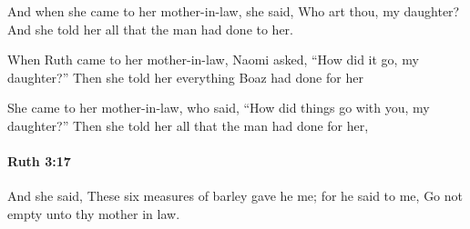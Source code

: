 			\begin{versebox}
					\item[BHS] 
					\item[LXX] 
					\item[ASV] And when she came to her mother-in-law, she said, Who art thou, my daughter? And she told her all that the man had done to her.
					\item[NIV] When Ruth came to her mother-in-law, Naomi asked, “How did it go, my daughter?” Then she told her everything Boaz had done for her
					\item[NRSV] She came to her mother-in-law, who said, “How did things go with you, my daughter?” Then she told her all that the man had done for her,
			\end{versebox}

		\paragraph{Ruth 3:17} %
			\label{RUTH-3-17}

			And she said, These six measures of barley gave he me; for he said to me, Go not empty unto thy mother in law.

